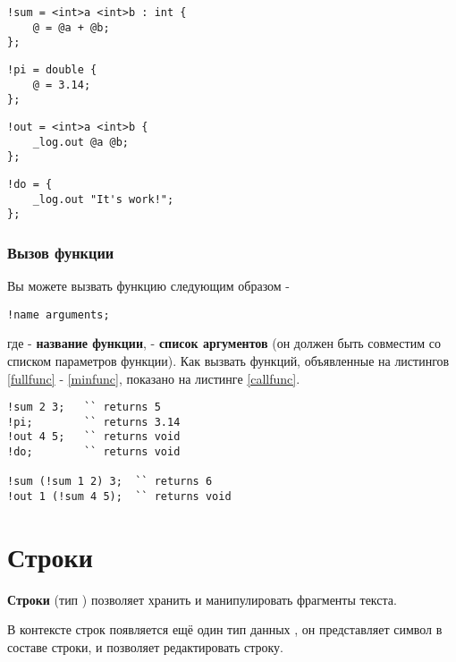 \documentclass[a4paper, 14pt]{extarticle}
\begin{document}
\begin{lstlisting}[caption=Полноценная функция, label=fullfunc]
!sum = <int>a <int>b : int {
	@ = @a + @b;
};
\end{lstlisting}

\begin{lstlisting}[caption=Функция без аргументов, label=noargsfunc]
!pi = double {
	@ = 3.14;
};
\end{lstlisting}

\begin{lstlisting}[caption=Функция без типа возвращаемой значений, label=notypefunc]
!out = <int>a <int>b {
	_log.out @a @b;
};
\end{lstlisting}

\begin{lstlisting}[caption=Функция без аргументов и тип возвращаемой значений, label=minfunc]
!do = {
	_log.out "It's work!";
};
\end{lstlisting}

\subsubsection{Вызов функции}

Вы можете вызвать функцию следующим образом -
\begin{lstlisting}[numbers=none]
!name arguments;
\end{lstlisting}
где  - {\bf название функции},  - {\bf список аргументов} (он должен быть совместим со списком параметров функции). Как вызвать функций, объявленные на листингов \ref{fullfunc} - \ref{minfunc}, показано на листинге \ref{callfunc}.


\begin{lstlisting}[caption=Вызов функций, label=callfunc]
!sum 2 3; 	`` returns 5
!pi; 		`` returns 3.14
!out 4 5; 	`` returns void
!do; 		`` returns void

!sum (!sum 1 2) 3;	`` returns 6
!out 1 (!sum 4 5);	`` returns void
\end{lstlisting}

\newpage
\section{Строки}

{\bf Строки} (тип \str{}) позволяет хранить и манипулировать фрагменты текста. 

В контексте строк появляется ещё один тип данных \chartype{}, он представляет символ в составе строки, и позволяет редактировать строку.
\end{document}
